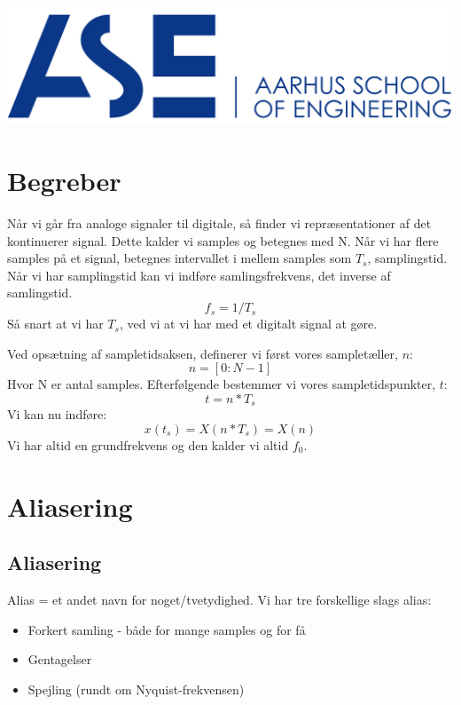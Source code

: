 \documentclass[12pt, letterpaper]{article}
\begin{document}
\begin{titlepage}
\includegraphics[scale=0.5]{billeder/au}\\ %
 

\vfill %


\end{titlepage}

\tableofcontents
\newpage

\section{Begreber}

Når vi går fra analoge signaler til digitale, så finder vi repræsentationer af det kontinuerer signal. Dette kalder vi samples og betegnes med N.
Når vi har flere samples på et signal, betegnes intervallet i mellem samples som $T_s$, samplingstid. Når vi har samplingstid kan vi indføre samlingsfrekvens, det inverse af samlingstid. $$f_s = 1/T_s$$
Så snart at vi har $T_s$, ved vi at vi har med et digitalt signal at gøre.

Ved opsætning af sampletidsaksen, definerer vi først vores sampletæller, $n$:
$$n = [0:N-1]$$ Hvor N er antal samples.
Efterfølgende bestemmer vi vores sampletidspunkter, $t$:
$$t = n*T_s$$
Vi kan nu indføre:
$$x(t_s) = X(n*T_s) = X(n)$$
Vi har altid en grundfrekvens og den kalder vi altid $f_0$.

\section{Aliasering}

\subsection{Aliasering}


Alias = et andet navn for noget/tvetydighed.
Vi har tre forskellige slags alias:
\begin{itemize}
\item Forkert samling - både for mange samples og for få
\item Gentagelser
\item Spejling (rundt om Nyquist-frekvensen)
\end{itemize}
\end{document}
